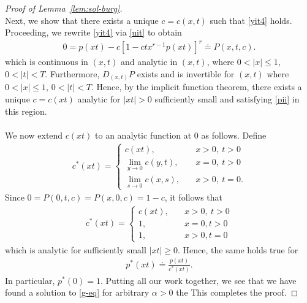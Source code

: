 \documentclass[12pt,reqno]{amsart}
\numberwithin{equation}{section}  %
\numberwithin{figure}{section}
\begin{document}
\begin{proof}[Proof of Lemma~\ref{lem:sol-burg}]
\begin{equation*}
\end{equation*}
%
%
Next, we show that there exists a unique $c = c(x,t) $ such that \eqref{yit4} holds. Proceeding, we rewrite \eqref{yit4} via \eqref{uit} to obtain
%
%
\begin{equation}
  \label{pii}
\begin{split}
  0 = p(xt) - c \left[ 1 - ctx^{r-1}p(xt) \right]^{r} \doteq P(x,t,c).
\end{split}
\end{equation}
%
%
which is continuous in $(x, t)$ and analytic in $(x,t)$, where $0 < |x| \le 1$, $0 < |t| < T$. Furthermore, $D_{(x,t)}P$ exists and is invertible for $(x,t)$ where $0 < |x| \le 1$, $0 < |t| < T$. Hence, by the implicit function theorem,
there exists a unique $c = c(xt)$ analytic for $|xt| > 0$ sufficiently small and satisfying \eqref{pii} in this region. 
\\
\\
We now extend $c(xt)$ to an analytic function at $0$ as follows. Define
%
%
\begin{equation*}
\begin{split}
  c^{*}(xt) = 
  \begin{cases} 
    c(xt), \quad & x > 0, \ t > 0 
    \\
    \lim_{y \to 0} c(y,t), \quad & x = 0, \ t > 0
    \\
    \lim_{s \to 0} c(x,s), \quad & x > 0, \ t = 0.
  \end{cases}
\end{split}
\end{equation*}
%
%
Since $0 = P(0, t, c) = P(x, 0, c) = 1 - c$, it follows that
%
%
\begin{equation*}
\begin{split}
  c^{*}(xt) = 
  \begin{cases} 
    c(xt), \quad & x > 0, \ t > 0 
    \\
    1, \quad & x = 0, t > 0
    \\
    1, \quad & x > 0, t = 0
  \end{cases}
\end{split}
\end{equation*}
%
which is analytic for sufficiently small $|xt|\ge 0$. Hence, the same holds true for
%
%
%
\begin{equation*}
\begin{split}
  p^{*}(xt) \doteq \frac{p(xt)}{c^{*}(xt)}.
\end{split}
\end{equation*}
%
%
In particular, $p^{*}(0) =1$. Putting all our work together, we see that we have found a solution to \eqref{g-eq} for arbitrary $\alpha > 0$ the This completes the proof.
\end{proof}
\end{document}
